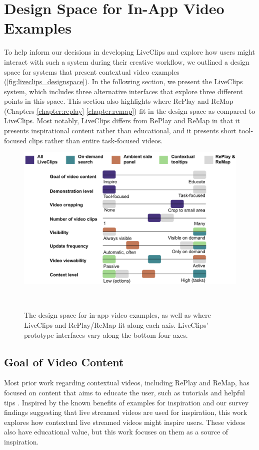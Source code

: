 \section{Design Space for In-App Video Examples}
To help inform our decisions in developing LiveClips and explore how users might interact with such a system during their creative workflow, we outlined a design space for systems that present contextual video examples (\autoref{fig:liveclips_designspace}). In the following section, we present the LiveClips system, which includes three alternative interfaces that explore three different points in this space. This section also highlights where RePlay and ReMap (Chapters \ref{chapter:replay}-\ref{chapter:remap}) fit in the design space as compared to LiveClips. Most notably, LiveClips differs from RePlay and ReMap in that it presents inspirational content rather than educational, and it presents short tool-focused clips rather than entire task-focused videos.

\begin{figure}[b!]
\centering
  \includegraphics[width=\columnwidth]{liveclips/figures/designspace.png}
  \caption{The design space for in-app video examples, as well as where LiveClips and RePlay/ReMap fit along each axis. LiveClips' prototype interfaces vary along the bottom four axes. }~\label{fig:liveclips_designspace}
\end{figure}

\subsection{Goal of Video Content}
Most prior work regarding contextual videos, including RePlay and ReMap, has focused on content that aims to educate the user, such as tutorials \cite{Pongnumkul2011} and helpful tips \cite{Grossman2010a}. Inspired by the known benefits of examples for inspiration \cite{Kulkarni2014} and our survey findings suggesting that live streamed videos are used for inspiration, this work explores how contextual live streamed videos might inspire users. These videos also have educational value, but this work focuses on them as a source of inspiration. 

